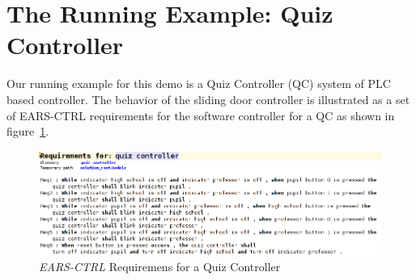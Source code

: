 \vspace{-.5cm}
\section{The Running Example: Quiz Controller}
\label{sec:example}
\vspace{-.3cm}
Our running example for this demo is a Quiz Controller (QC) system of
PLC based controller. The behavior
of the sliding door controller is illustrated as a set of \textsf{EARS-CTRL} requirements for the software controller for a QC as shown in
figure~\ref{fig:QC_reqs}.
\begin{figure}[!h]
\centering
\includegraphics[width=1\textwidth]{./images/QC_Reqs.png}
\caption{\emph{EARS-CTRL} Requiremens for a Quiz Controller}
\label{fig:QC_reqs}
\end{figure}